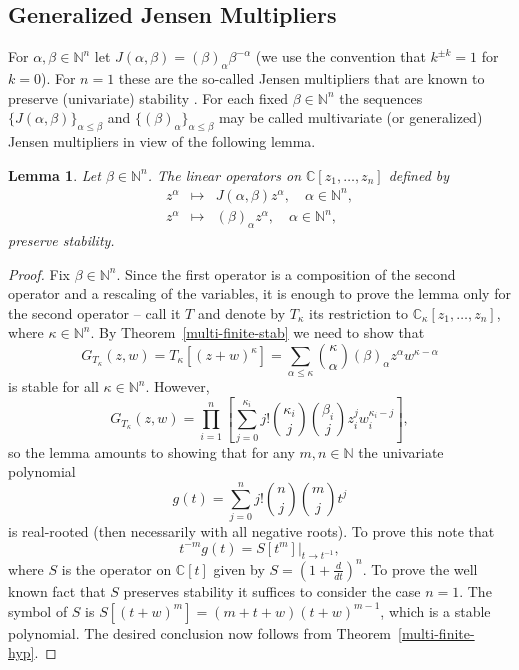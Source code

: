 \documentclass[10pt,reqno]{amsart}
\theoremstyle{plain}
\newtheorem{lemma}[theorem]{Lemma}
\theoremstyle{definition}
\theoremstyle{remark}
\numberwithin{equation}{section}
\newcommand{\NN}{\mathbb{N}}
\newcommand{\CC}{\mathbb{C}}
\begin{document}
{\allowdisplaybreaks 
\subsection{Generalized Jensen Multipliers}\label{ss-82}

For $\alpha, \beta \in \NN^n$ let $J(\alpha, \beta)= (\beta)_\alpha 
\beta^{-\alpha}$ (we use the convention that $k^{\pm k}=1$ for $k=0$). 
For $n=1$ these are the so-called Jensen multipliers that are known
to preserve (univariate) stability \cite{CC1,Le,RS}. For 
each fixed $\beta\in\NN^n$ the sequences 
$\{J(\alpha,\beta)\}_{\alpha\le \beta}$ and 
$\{(\beta)_\alpha\}_{\alpha\le \beta}$ may be called multivariate (or 
generalized) Jensen multipliers in view of the following lemma.

\begin{lemma}\label{multi}
Let $\beta \in \NN^n$. The linear operators on $\CC[z_1,\ldots,z_n]$
defined by 
\begin{eqnarray*}
z^\alpha &\mapsto& J(\alpha, \beta)z^\alpha,\quad \alpha\in\NN^n, \\
z^\alpha &\mapsto& (\beta)_\alpha z^\alpha, \quad \alpha\in\NN^n,
\end{eqnarray*}
preserve stability. 
\end{lemma}

\begin{proof}
Fix $\beta \in \NN^n$. Since the first operator is a composition of the second
operator and a rescaling of the variables, it is enough to prove the lemma 
only for the 
second operator -- call it $T$ and denote by $T_\kappa$ its
restriction to $\CC_\kappa[z_1,\ldots,z_n]$, where $\kappa \in \NN^n$. 
By Theorem~\ref{multi-finite-stab} we need to show that 
$$
G_{T_\kappa}(z,w)=T_\kappa[(z+w)^\kappa] 
= \sum_{\alpha \leq \kappa} \binom \kappa \alpha (\beta)_\alpha 
z^\alpha w^{\kappa-\alpha} 
$$
is stable for all $\kappa \in \NN^n$. However, 
$$
G_{T_\kappa}(z,w)= \prod_{i=1}^n\left[\sum_{j=0}^{\kappa_i} j! 
\binom {\kappa_i} {j} \binom {\beta_i} {j} z_i^j w_i^{\kappa_i-j}\right],
$$
so the lemma amounts to showing that for any $m,n \in \NN$
the univariate polynomial 
$$g(t)=\sum_{j=0}^{n} j! \binom {n} j \binom {m} j t^j$$ 
is real-rooted (then necessarily with all negative roots). 
To prove this note that 
$$t^{-m}g(t)=S\!\left[t^{m}\right]\Big|_{t\to t^{-1}},$$
where $S$ is the operator on $\CC[t]$ given by 
$S=\left(1+\frac{d}{dt}\right)^n$. 
To prove the well known fact that $S$ preserves stability it suffices to 
consider the case $n=1$. The symbol of $S$ is $S[(t+w)^m]=(m+t+w)(t+w)^{m-1}$,
which is a stable polynomial. The desired conclusion now follows  
from Theorem~\ref{multi-finite-hyp}.
\end{proof}

}
\end{document}
